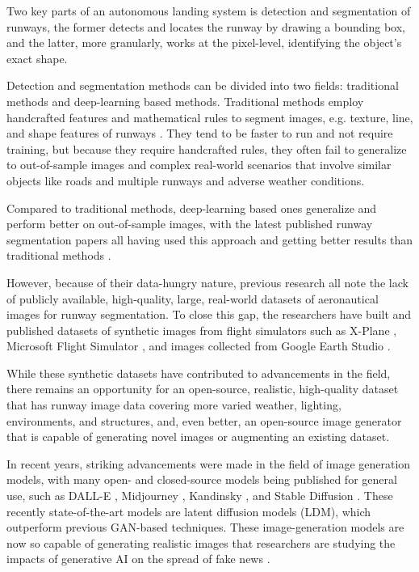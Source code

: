 Two key parts of an autonomous landing system is detection and segmentation of runways, the former detects and locates the runway by drawing a bounding box, and the latter, more granularly, works at the pixel-level, identifying the object's exact shape.

Detection and segmentation methods can be divided into two fields: traditional methods and deep-learning based methods. Traditional methods employ handcrafted features and mathematical rules to segment images, e.g. texture, line, and shape features of runways \cite{aytekin_texture-based_2013} \cite{ye_research_2020}. They tend to be faster to run and not require training, but because they require handcrafted rules, they often fail to generalize to out-of-sample images and complex real-world scenarios that involve similar objects like roads and multiple runways and adverse weather conditions.

Compared to traditional methods, deep-learning based ones generalize and perform better on out-of-sample images, with the latest published runway segmentation papers all having used this approach and getting better results than traditional methods \cite{chen_image-based_2024} \cite{wang_valnet_2024}.

However, because of their data-hungry nature, previous research \cite{wang_valnet_2024} \cite{chen_image-based_2024} \cite{chen_bars_2023} \cite{ducoffe_lard_2023} all note the lack of publicly available, high-quality, large, real-world datasets of aeronautical images for runway segmentation. To close this gap, the researchers have built and published datasets of synthetic images from flight simulators such as X-Plane \cite{chen_bars_2023} \cite{wang_valnet_2024}, Microsoft Flight Simulator \cite{chen_image-based_2024}, and images collected from Google Earth Studio \cite{ducoffe_lard_2023}.

While these synthetic datasets have contributed to advancements in the field, there remains an opportunity for an open-source, realistic, high-quality dataset that has runway image data covering more varied weather, lighting, environments, and structures, and, even better, an open-source image generator that is capable of generating novel images or augmenting an existing dataset.

In recent years, striking advancements were made in the field of image generation models, with many open- and closed-source models being published for general use, such as DALL-E \cite{betker_improving_nodate}, Midjourney \cite{midjourney_midjourney_nodate}, Kandinsky \cite{arkhipkin_kandinsky_2024}, and Stable Diffusion \cite{rombach_high-resolution_2022}. These recently state-of-the-art models are latent diffusion models (LDM), which outperform previous GAN-based techniques. These image-generation models are now so capable of generating realistic images that researchers are studying the impacts of generative AI on the spread of fake news \cite{loth_blessing_2024}.

